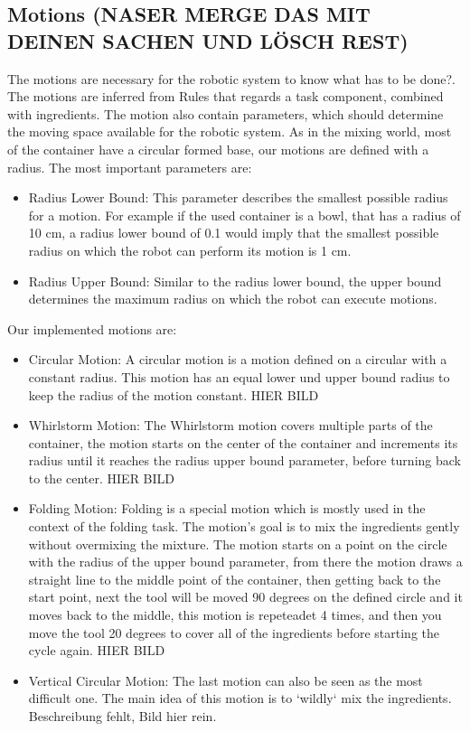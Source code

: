 \subsection{Motions (NASER MERGE DAS MIT DEINEN SACHEN UND LÖSCH REST)}
The motions are necessary for the robotic system to know what has to be done?. The motions are inferred from Rules that regards a task component, combined with ingredients.
The motion also contain parameters, which should determine the moving space available for the robotic system. As in the mixing world, most of the container have a circular formed base, our motions are defined with a radius.
The most important parameters are:
\begin{itemize}
    \item Radius Lower Bound: This parameter describes the smallest possible radius for a motion. For example if the used container is a bowl, that has a radius of 10 cm, a radius lower bound of 0.1 would imply that the smallest possible radius on which the robot can perform its motion is 1 cm.
    \item Radius Upper Bound: Similar to the radius lower bound, the upper bound determines the maximum radius on which the robot can execute motions.
\end{itemize}
Our implemented motions are:
\begin{itemize}
    \item Circular Motion: A circular motion is a motion defined on a circular with a constant radius. This motion has an equal lower und upper bound radius to keep the radius of the motion constant.  \newline HIER BILD
    \item Whirlstorm Motion: The Whirlstorm motion covers multiple parts of the container, the motion starts on the center of the container and increments its radius until it reaches the radius upper bound parameter, before turning back to the center. \newline HIER BILD
    \item Folding Motion: Folding is a special motion which is mostly used in the context of the folding task. The motion's goal is to mix the ingredients gently without overmixing the mixture. The motion starts on a point on the circle with the radius of the upper bound parameter, from there the motion draws a straight line to the middle point of the container, then getting back to the start point, next the tool will be moved 90 degrees on the defined circle and it moves back to the middle, this motion is repeteadet 4 times, and then you move the tool 20 degrees to cover all of the ingredients before starting the cycle again. \newline HIER BILD
    \item Vertical Circular Motion: The last motion can also be seen as the most difficult one. The main idea of this motion is to `wildly` mix the ingredients. Beschreibung fehlt, Bild hier rein.
\end{itemize}

